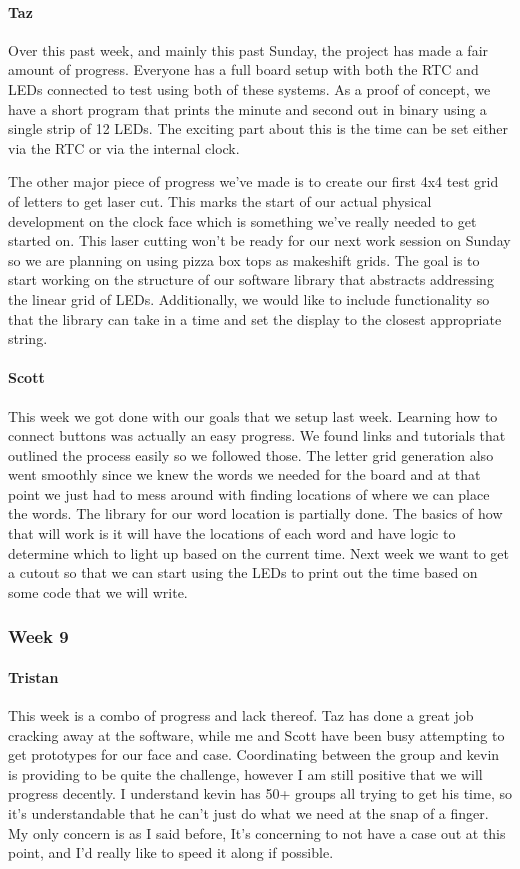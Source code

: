 \documentclass[onecolumn, draftclsnofoot,10pt, compsoc]{IEEEtran}
\begin{document}
\paragraph{Taz}
Over this past week, and mainly this past Sunday, the project has made a fair amount of progress. Everyone has a full board setup with both the RTC and LEDs connected to test using both of these systems. As a proof of concept, we have a short program that prints the minute and second out in binary using a single strip of 12 LEDs. The exciting part about this is the time can be set either via the RTC or via the internal clock.

The other major piece of progress we've made is to create our first 4x4 test grid of letters to get laser cut. This marks the start of our actual physical development on the clock face which is something we've really needed to get started on. This laser cutting won't be ready for our next work session on Sunday so we are planning on using pizza box tops as makeshift grids. The goal is to start working on the structure of our software library that abstracts addressing the linear grid of LEDs. Additionally, we would like to include functionality so that the library can take in a time and set the display to the closest appropriate string.
\paragraph{Scott}
This week we got done with our goals that we setup last week. Learning how to connect buttons was actually an easy progress. We found links and tutorials that outlined the process easily so we followed those. The letter grid generation also went smoothly since we knew the words we needed for the board and at that point we just had to mess around with finding locations of where we can place the words. The library for our word location is partially done. The basics of how that will work is it will have the locations of each word and have logic to determine which to light up based on the current time. Next week we want to get a cutout so that we can start using the LEDs to print out the time based on some code that we will write.
\subsubsection{Week 9}
\paragraph{Tristan}
This week is a combo of progress and lack thereof. Taz has done a great job cracking away at the software, while me and Scott have been busy attempting to get prototypes for our face and case. Coordinating between the group and kevin is providing to be quite the challenge, however I am still positive that we will progress decently. I understand kevin has 50+ groups all trying to get his time, so it's understandable that he can't just do what we need at the snap of a finger. My only concern is as I said before, It's concerning to not have a case out at this point, and I'd really like to speed it along if possible.
\end{document}
